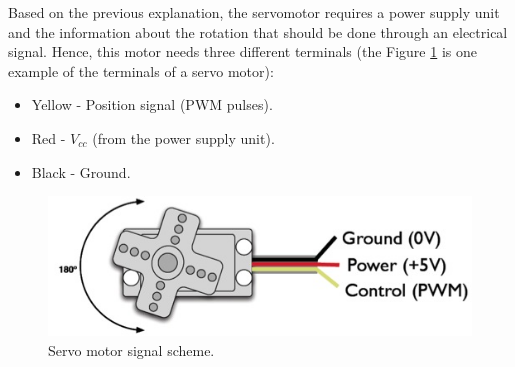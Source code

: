 Based on the previous explanation, the servomotor requires a power supply unit and the information about the rotation that should be done through an electrical signal. Hence, this motor needs three different terminals (the Figure \ref{cable_servo} is one example of the terminals of a servo motor):
\begin{itemize}  
        \item Yellow - Position signal (PWM pulses).
        \item Red - $V_{cc}$ (from the power supply unit). 
        \item Black - Ground.
\end{itemize}

\begin{figure}[H]
\centering
\includegraphics[scale=0.7]{figures/cable_servo.jpg}
\caption{Servo motor signal scheme.}
\label{cable_servo}
\end{figure}

